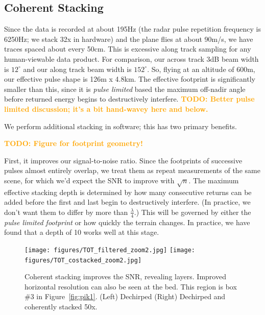 \documentclass[11pt]{article}
\newcommand{\todo}[1]{\ifthenelse{\boolean{include-todos}} {\textcolor{Red}{\textbf{TODO: #1}}}{}}
\newcommand{\future}[1]{\ifthenelse{\boolean{include-future}} {\textcolor{Orange}{\textbf{TODO: #1}}}{}}
\newcommand{\figref}[1]{Figure~\ref{#1}}
\begin{document}
\subsection{Coherent Stacking}
\label{sec:coherent_stacking}

Since the data is recorded at about 195Hz (the radar pulse repetition frequency is 6250Hz; we stack 32x in hardware) and the plane flies at about 90m/s, we have traces spaced about every 50cm. 
This is excessive along track sampling for any human-viewable data product. For comparison, our across track 3dB beam width is $12^\circ$ and our along track beam width is $152^\circ$\cite{Peters2007}.
So, flying at an altitude of 600m, our effective pulse shape is 126m x 4.8km. The effective footprint is significantly smaller than this, since it is \emph{pulse limited} based the maximum off-nadir angle before returned energy begins to destructively interfere.
\future{Better pulse limited discussion; it's a bit hand-wavey here and below.}

We perform additional stacking in software; this has two primary benefits.

\future{Figure for footprint geometry!}

First, it improves our signal-to-noise ratio. 
Since the footprints of successive pulses almost entirely overlap, we treat them as repeat measurements of the same scene, for which we'd expect the SNR to improve with $\sqrt{n}$. The maximum effective stacking depth is determined by how many consecutive returns can be added before the first and last begin to destructively interfere. (In practice, we don't want them to differ by more than $\frac{\lambda}{4}$.) This will be governed by either the \emph{pulse limited footprint} or how quickly the terrain changes. In practice, we have found that a depth of 10 works well at this stage.

\begin{figure}[ht!]
\centering
\texttt{[image: figures/TOT\_filtered\_zoom2.jpg]}
\texttt{[image: figures/TOT\_costacked\_zoom2.jpg]}
\caption[]{Coherent stacking improves the SNR, revealing layers. Improved horizontal resolution can also be seen at the bed. This region is box \#3 in \figref{fig:pik1}. (Left) Dechirped (Right) Dechirped and coherently stacked 50x.}
\end{figure}
\end{document}
